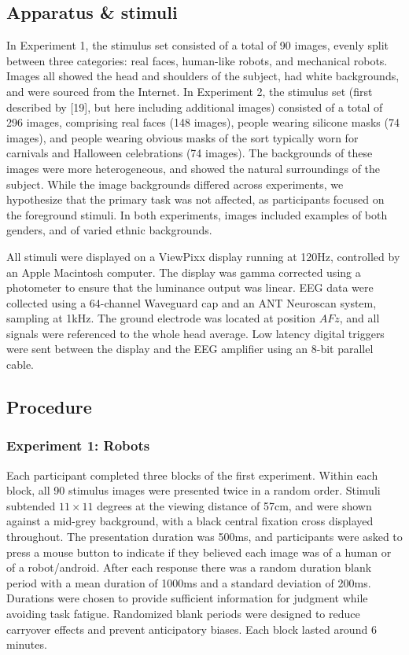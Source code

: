 \documentclass[
]{article}
\begin{document}
\subsection{Apparatus \& stimuli}\label{apparatus-stimuli}

In Experiment 1, the stimulus set consisted of a total of 90 images, evenly split between three categories: real faces, human-like robots, and mechanical robots. Images all showed the head and shoulders of the subject, had white backgrounds, and were sourced from the Internet. In Experiment 2, the stimulus set (first described by {[}19{]}, but here including additional images) consisted of a total of 296 images, comprising real faces (148 images), people wearing silicone masks (74 images), and people wearing obvious masks of the sort typically worn for carnivals and Halloween celebrations (74 images). The backgrounds of these images were more heterogeneous, and showed the natural surroundings of the subject. While the image backgrounds differed across experiments, we hypothesize that the primary task was not affected, as participants focused on the foreground stimuli. In both experiments, images included examples of both genders, and of varied ethnic backgrounds.

All stimuli were displayed on a ViewPixx display running at 120Hz, controlled by an Apple Macintosh computer. The display was gamma corrected using a photometer to ensure that the luminance output was linear. EEG data were collected using a 64-channel Waveguard cap and an ANT Neuroscan system, sampling at 1kHz. The ground electrode was located at position \(AFz\), and all signals were referenced to the whole head average. Low latency digital triggers were sent between the display and the EEG amplifier using an 8-bit parallel cable.

\subsection{Procedure}\label{procedure}

\subsubsection{Experiment 1: Robots}\label{experiment-1-robots}

Each participant completed three blocks of the first experiment. Within each block, all 90 stimulus images were presented twice in a random order. Stimuli subtended \(11\times11\) degrees at the viewing distance of 57cm, and were shown against a mid-grey background, with a black central fixation cross displayed throughout. The presentation duration was 500ms, and participants were asked to press a mouse button to indicate if they believed each image was of a human or of a robot/android. After each response there was a random duration blank period with a mean duration of 1000ms and a standard deviation of 200ms. Durations were chosen to provide sufficient information for judgment while avoiding task fatigue. Randomized blank periods were designed to reduce carryover effects and prevent anticipatory biases. Each block lasted around 6 minutes.
\end{document}
